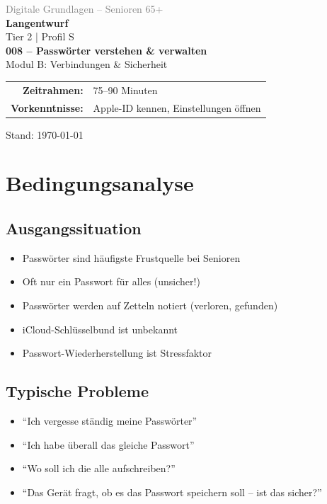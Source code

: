 \documentclass[11pt,a4paper]{article}
\begin{document}
\begin{titlepage}
    \centering
    \vspace*{2cm}
    {\Large\textcolor{gray}{Digitale Grundlagen -- Senioren 65+}}\\[2cm]
    {\Huge\textcolor{fach}{\textbf{Langentwurf}}}\\[0.5cm]
    {\large Tier 2 | Profil S}\\[2cm]
    {\LARGE\textbf{008 -- Passwörter verstehen \& verwalten}}\\[0.5cm]
    {\large Modul B: Verbindungen \& Sicherheit}\\[2cm]
    \begin{tabular}{rl}
        \textbf{Zeitrahmen:} & 75--90 Minuten \\
        \textbf{Vorkenntnisse:} & Apple-ID kennen, Einstellungen öffnen \\
    \end{tabular}
    \vfill
    {\normalsize Stand: \today}
\end{titlepage}

\tableofcontents
\newpage

\section{Bedingungsanalyse}

\subsection{Ausgangssituation}
\begin{itemize}
    \item Passwörter sind häufigste Frustquelle bei Senioren
    \item Oft nur ein Passwort für alles (unsicher!)
    \item Passwörter werden auf Zetteln notiert (verloren, gefunden)
    \item iCloud-Schlüsselbund ist unbekannt
    \item Passwort-Wiederherstellung ist Stressfaktor
\end{itemize}

\subsection{Typische Probleme}
\begin{itemize}
    \item ``Ich vergesse ständig meine Passwörter''
    \item ``Ich habe überall das gleiche Passwort''
    \item ``Wo soll ich die alle aufschreiben?''
    \item ``Das Gerät fragt, ob es das Passwort speichern soll -- ist das sicher?''
\end{itemize}
\end{document}
